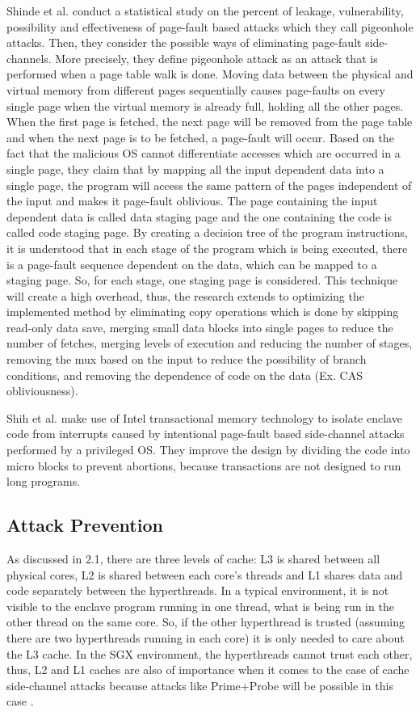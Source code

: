 Shinde et al. \cite{pigeonhole} conduct a statistical study on the percent of leakage, vulnerability, possibility and effectiveness of page-fault based attacks which they call pigeonhole attacks. Then, they consider the possible ways of eliminating page-fault side-channels. More precisely, they define pigeonhole attack as an attack that is performed when a page table walk is done. Moving data between the physical and virtual memory from different pages sequentially causes page-faults on every single page when the virtual memory is already full, holding all the other pages. When the first page is fetched, the next page will be removed from the page table and when the next page is to be fetched, a page-fault will occur. Based on the fact that the malicious OS cannot differentiate accesses which are occurred in a single page, they claim that by mapping all the input dependent data into a single page, the program will access the same pattern of the pages independent of the input and makes it page-fault oblivious. The page containing the input dependent data is called data staging page and the one containing the code is called code staging page. By creating a decision tree of the program instructions, it is understood that in each stage of the program which is being executed, there is a page-fault sequence dependent on the data, which can be mapped to a staging page. So, for each stage, one staging page is considered. This technique will create a high overhead, thus, the research extends to optimizing the implemented method by eliminating copy operations which is done by skipping read-only data save, merging small data blocks into single pages to reduce the number of fetches, merging levels of execution and reducing the number of stages, removing the mux based on the input to reduce the possibility of branch conditions, and removing the dependence of code on the data (Ex. CAS obliviousness).

Shih et al. \cite{tsgx} make use of Intel transactional memory technology to isolate enclave code from interrupts caused by intentional page-fault based side-channel attacks performed by a privileged OS. They improve the design by dividing the code into micro blocks to prevent abortions, because transactions are not designed to run long programs.


\subsection{Attack Prevention}%
As discussed in 2.1, there are three levels of cache: L3 is shared between all physical cores, L2 is shared between each core's threads and L1 shares data and code separately between the hyperthreads. In a typical environment, it is not visible to the enclave program running in one thread, what is being run in the other thread on the same core. So, if the other hyperthread is trusted (assuming there are two hyperthreads running in each core) it is only needed to care about the L3 cache. In the SGX environment, the hyperthreads cannot trust each other, thus, L2 and L1 caches are also of importance when it comes to the case of cache side-channel attacks because attacks like Prime+Probe will be possible in this case \cite{cloak}.

